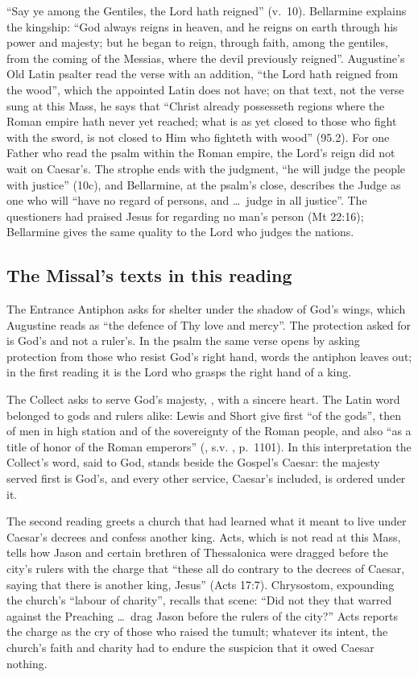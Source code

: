 ``Say ye among the Gentiles, the Lord hath reigned'' (v.~10). Bellarmine
explains the kingship: ``God always reigns in heaven, and he reigns on earth
through his power and majesty; but he began to reign, through faith, among the
gentiles, from the coming of the Messias, where the devil previously reigned''.
Augustine's Old Latin psalter read the verse with an addition, ``the Lord hath
reigned from the wood'', which the appointed Latin does not have; on that text,
not the verse sung at this Mass, he says that ``Christ already possesseth
regions where the Roman empire hath never yet reached; what is as yet closed to
those who fight with the sword, is not closed to Him who fighteth with wood''
(95.2). For one Father who read the psalm within the Roman empire, the Lord's
reign did not wait on Caesar's. The strophe ends with the judgment, ``he will judge the people with justice'' (10c), and Bellarmine,
at the psalm's close, describes the Judge as one who will ``have no regard of
persons, and \ldots\ judge in all justice''. The questioners had praised Jesus
for regarding no man's person (Mt 22:16); Bellarmine gives the same quality to
the Lord who judges the nations.

\subsection{The Missal's texts in this reading}

The Entrance Antiphon asks for shelter under the shadow of God's wings, which
Augustine reads as ``the defence of Thy love and mercy''. The protection asked
for is God's and not a ruler's. In the psalm the same verse opens by asking
protection from those who resist God's right hand, words the antiphon leaves
out; in the first reading it is the Lord who grasps the right hand of a
king.

The Collect asks to serve God's majesty, , with a sincere heart. The Latin word belonged to gods and rulers
alike: Lewis and Short give \latin{maiestas} first ``of the gods'', then of
men in high station and of the sovereignty of the Roman people, and also ``as
a title of honor of the Roman emperors'' (\work{Latin Dictionary}, s.v.
\latin{majestas}, p.~1101). In this interpretation the Collect's
word, said to God, stands beside the Gospel's Caesar: the majesty served
first is God's, and every other service, Caesar's included, is ordered under
it.

The second reading greets a church that had learned what it meant to live
under Caesar's decrees and confess another king. Acts, which is not read at
this Mass, tells how Jason and certain brethren of Thessalonica were dragged
before the city's rulers with the charge that ``these all do contrary to the
decrees of Caesar, saying that there is another king, Jesus'' (Acts 17:7).
Chrysostom, expounding the church's ``labour of charity'', recalls that scene: ``Did not
they that warred against the Preaching \ldots\ drag Jason before the rulers of
the city?'' Acts reports the charge as the cry of those who raised the
tumult; whatever its intent, the church's faith and charity had to endure the
suspicion that it owed Caesar nothing.

